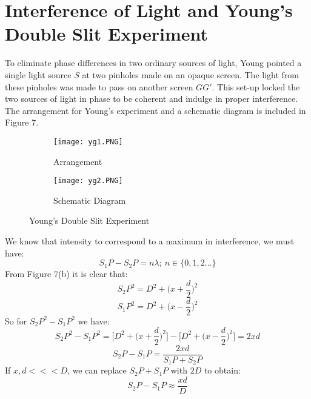 \documentclass{article}
\begin{document}
\section{Interference of Light and Young's Double Slit Experiment}
To eliminate phase differences in two ordinary sources of light, Young pointed a single light source $S$ at two pinholes made on an opaque screen. The light from these pinholes was made to pass on another screen $GG'$. This set-up locked the two sources of light in phase to be coherent and indulge in proper interference. The arrangement for Young's experiment and a schematic diagram is included in Figure 7. \newpage
\begin{figure}
     \centering
     \begin{subfigure}[b]{0.45\textwidth}
         \centering
         \texttt{[image: yg1.PNG]}
         \caption{Arrangement}
         \label{fig:y equals x}
     \end{subfigure}
     \hfill
     \begin{subfigure}[b]{0.45\textwidth}
         \centering
         \texttt{[image: yg2.PNG]}
         \caption{Schematic Diagram}
         \label{fig:three sin x}
     \end{subfigure}
    \caption{Young's Double Slit Experiment}
    \label{fig:Young's Experiment}
\end{figure}
 We know that intensity to correspond to a maximum in interference, we must have:
\begin{equation*}
    S_{1}P - S_{2}P = n \lambda; \ n \in \{0,1,2...\}
\end{equation*}
From Figure 7(b) it is clear that:
\begin{equation*}
    {S_{2}P}^{2} = D^{2} + \bigg(x + \frac{d}{2} \bigg)^{2}
\end{equation*}
\begin{equation*}
    {S_{1}P}^{2} = D^{2} + \bigg(x - \frac{d}{2}\bigg)^{2}
\end{equation*}
So for $S_{2}P^{2} - S_{1}P^{2}$ we have:
\begin{equation*}
    S_{2}P^{2} - S_{1}P^{2} = \Bigg[D^{2} + \bigg(x + \frac{d}{2} \bigg)^{2} \Bigg] - \Bigg[D^{2} + \bigg(x - \frac{d}{2}\bigg)^{2}\Bigg] = 2xd
\end{equation*}
\begin{equation*}
    S_{2}P - S_{1}P = \frac{2xd}{S_{1}P+S_{2}P}
\end{equation*}
If $x, d <<< D$, we can replace $S_{2}P + S_{1}P$ with $2D$ to obtain:
\begin{equation*}
    S_{2}P - S_{1}P  \approx \frac{xd}{D}
\end{equation*}
\end{document}
